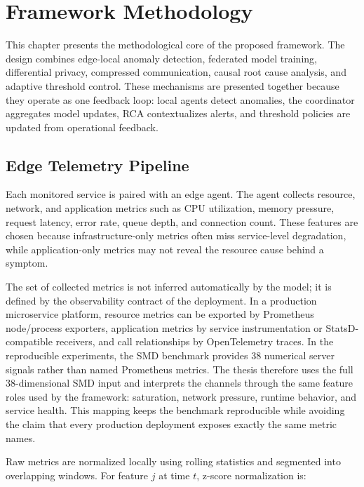 \chapter{Framework Methodology}
\label{ch:framework}
\label{ch:edge_computing}
\label{ch:federated_learning}
\label{ch:communication}
\label{ch:root_cause_analysis}
\label{ch:adaptive_thresholding}

This chapter presents the methodological core of the proposed framework. The
design combines edge-local anomaly detection, federated model training,
differential privacy, compressed communication, causal root cause analysis, and
adaptive threshold control. These mechanisms are presented together because they
operate as one feedback loop: local agents detect anomalies, the coordinator
aggregates model updates, RCA contextualizes alerts, and threshold policies are
updated from operational feedback.

\section{Edge Telemetry Pipeline}
\label{sec:metrics_collection}

Each monitored service is paired with an edge agent. The agent collects
resource, network, and application metrics such as CPU utilization, memory
pressure, request latency, error rate, queue depth, and connection count. These
features are chosen because infrastructure-only metrics often miss
service-level degradation, while application-only metrics may not reveal the
resource cause behind a symptom.

The set of collected metrics is not inferred automatically by the model; it is
defined by the observability contract of the deployment. In a production
microservice platform, resource metrics can be exported by Prometheus
node/process exporters, application metrics by service instrumentation or
StatsD-compatible receivers, and call relationships by OpenTelemetry traces. In
the reproducible experiments, the SMD benchmark provides 38 numerical server
signals rather than named Prometheus metrics. The thesis therefore uses the full
38-dimensional SMD input and interprets the channels through the same feature
roles used by the framework: saturation, network pressure, runtime behavior, and
service health. This mapping keeps the benchmark reproducible while avoiding the
claim that every production deployment exposes exactly the same metric names.

Raw metrics are normalized locally using rolling statistics and segmented into
overlapping windows. For feature $j$ at time $t$, z-score normalization is:

